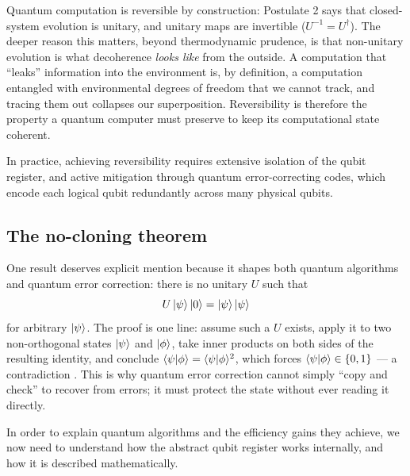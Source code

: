 Quantum computation is reversible by construction: Postulate 2 says that closed-system evolution is unitary, and unitary maps are invertible ($U^{-1} = U^\dagger$). The deeper reason this matters, beyond thermodynamic prudence, is that non-unitary evolution is what decoherence \emph{looks like} from the outside. A computation that ``leaks'' information into the environment is, by definition, a computation entangled with environmental degrees of freedom that we cannot track, and tracing them out collapses our superposition. Reversibility is therefore the property a quantum computer must preserve to keep its computational state coherent.

In practice, achieving reversibility requires extensive isolation of the qubit register, and active mitigation through quantum error-correcting codes, which encode each logical qubit redundantly across many physical qubits.

\subsection{The no-cloning theorem}

One result deserves explicit mention because it shapes both quantum algorithms and quantum error correction: there is no unitary $U$ such that
\begin{equation}
U\mathinner{|{\psi}\rangle}\mathinner{|{0}\rangle} = \mathinner{|{\psi}\rangle}\mathinner{|{\psi}\rangle}
\end{equation}
for arbitrary $\mathinner{|{\psi}\rangle}$. The proof is one line: assume such a $U$ exists, apply it to two non-orthogonal states $\mathinner{|{\psi}\rangle}$ and $\mathinner{|{\phi}\rangle}$, take inner products on both sides of the resulting identity, and conclude $\langle \psi|\phi\rangle = \langle \psi|\phi\rangle^2$, which forces $\langle \psi|\phi\rangle \in \{0,1\}$ --- a contradiction \cite{wootterszurek1982}. This is why quantum error correction cannot simply ``copy and check'' to recover from errors; it must protect the state without ever reading it directly.

In order to explain quantum algorithms and the efficiency gains they achieve, we now need to understand how the abstract qubit register works internally, and how it is described mathematically.
